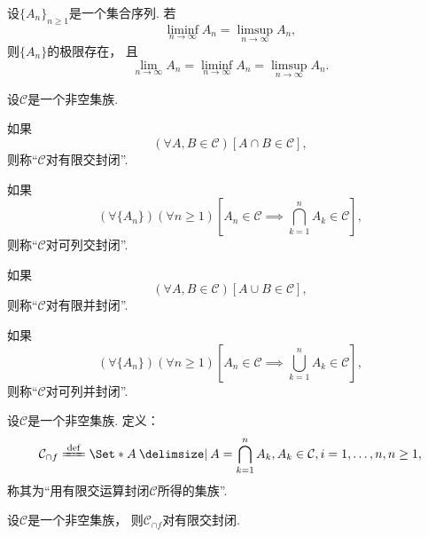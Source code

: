 \begin{proposition}
设\(\{A_n\}_{n\geq1}\)是一个集合序列.
若\[
	\liminf_{n\to\infty} A_n
	= \limsup_{n\to\infty} A_n,
\]
则\(\{A_n\}\)的极限存在，
且\[
	\lim_{n\to\infty} A_n
	= \liminf_{n\to\infty} A_n
	= \limsup_{n\to\infty} A_n.
\]
\end{proposition}

\begin{definition}[集族的封闭性]
设\(\mathcal{C}\)是一个非空集族.

如果\[
	(\forall A,B\in\mathcal{C})
	[A \cap B \in \mathcal{C}],
\]
则称“\(\mathcal{C}\)对有限交封闭”.

如果\[
	(\forall \{A_n\})
	(\forall n\geq1)
	\left[A_n\in\mathcal{C} \implies \bigcap_{k=1}^n A_k \in \mathcal{C}\right],
\]
则称“\(\mathcal{C}\)对可列交封闭”.

如果\[
	(\forall A,B\in\mathcal{C})
	[A \cup B \in \mathcal{C}],
\]
则称“\(\mathcal{C}\)对有限并封闭”.

如果\[
	(\forall \{A_n\})
	(\forall n\geq1)
	\left[A_n\in\mathcal{C} \implies \bigcup_{k=1}^n A_k \in \mathcal{C}\right],
\]
则称“\(\mathcal{C}\)对可列并封闭”.
\end{definition}

\begin{definition}
设\(\mathcal{C}\)是一个非空集族.
定义：\[
	\mathcal{C}_{\cap f}
	\defeq
	\Set*{
		A \given
		A = \bigcap_{k=1}^n A_k,
		A_k \in \mathcal{C}, i=1,\dotsc,n,
		n\geq1
	},
\]
称其为“用有限交运算封闭\(\mathcal{C}\)所得的集族”.
\end{definition}

\begin{proposition}
设\(\mathcal{C}\)是一个非空集族，
则\(\mathcal{C}_{\cap f}\)对有限交封闭.
\end{proposition}
